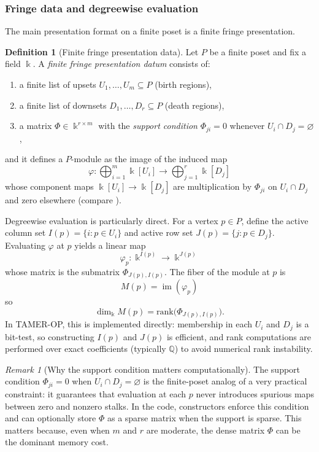 \documentclass{article}
\newcommand{\kk}{\Bbbk}
\newcommand{\<}{\langle}
\renewcommand{\>}{\rangle}
\DeclareMathOperator{\im}{im}
\theoremstyle{definition}
\newtheorem{defn}[theorem]{Definition}
\theoremstyle{remark}
\newtheorem*{remark}{Remark}
\begin{document}
	\subsubsection*{Fringe data and degreewise evaluation}
	
	The main presentation format on a finite poset is a finite fringe presentation.
	
	\begin{defn}[Finite fringe presentation data]\label{def:finite-fringe-data}
		Let $P$ be a finite poset and fix a field $\kk$.
		A \emph{finite fringe presentation datum} consists of:
		\begin{enumerate}[label=(\roman*)]
			\item a finite list of upsets $U_1,\dots,U_m\subseteq P$ (birth regions),
			\item a finite list of downsets $D_1,\dots,D_r\subseteq P$ (death regions),
			\item a matrix $\Phi\in \kk^{r\times m}$ with the \emph{support condition}
			$\Phi_{ji}=0$ whenever $U_i\cap D_j=\varnothing$,
		\end{enumerate}
		and it defines a $P$-module as the image of the induced map
		\[
		\varphi \colon \bigoplus_{i=1}^m \kk[U_i] \longrightarrow \bigoplus_{j=1}^r \kk[D_j]
		\]
		whose component maps $\kk[U_i]\to \kk[D_j]$ are multiplication by $\Phi_{ji}$ on
		$U_i\cap D_j$ and zero elsewhere (compare \cite[Defs.~3.16--3.17]{Mil20}).
	\end{defn}
	
	Degreewise evaluation is particularly direct.  For a vertex $p\in P$, define the active column set
	$I(p)=\{i : p\in U_i\}$ and active row set $J(p)=\{j : p\in D_j\}$.  Evaluating $\varphi$ at $p$ yields a linear
	map
	\[
	\varphi_p \colon \kk^{I(p)} \longrightarrow \kk^{J(p)}
	\]
	whose matrix is the submatrix $\Phi_{J(p),I(p)}$.  The fiber of the module at $p$ is
	\[
	M(p)=\im(\varphi_p)
	\]
	so
	\[
	\dim_\kk M(p)=\mathrm{rank}\big(\Phi_{J(p),I(p)}\big).
	\]
	In TAMER-OP, this is implemented directly: membership in each $U_i$ and $D_j$ is a bit-test, so constructing
	$I(p)$ and $J(p)$ is efficient, and rank computations are performed over exact coefficients (typically $\mathbb{Q}$)
	to avoid numerical rank instability.
	
	\begin{remark}[Why the support condition matters computationally]
		The support condition $\Phi_{ji}=0$ when $U_i\cap D_j=\varnothing$ is the finite-poset analog of a very
		practical constraint: it guarantees that evaluation at each $p$ never introduces spurious maps between
		zero and nonzero stalks.  In the code, constructors enforce this condition and can optionally store $\Phi$
		as a sparse matrix when the support is sparse.  This matters because, even when $m$ and $r$ are moderate,
		the dense matrix $\Phi$ can be the dominant memory cost.
	\end{remark}
	
\end{document}
